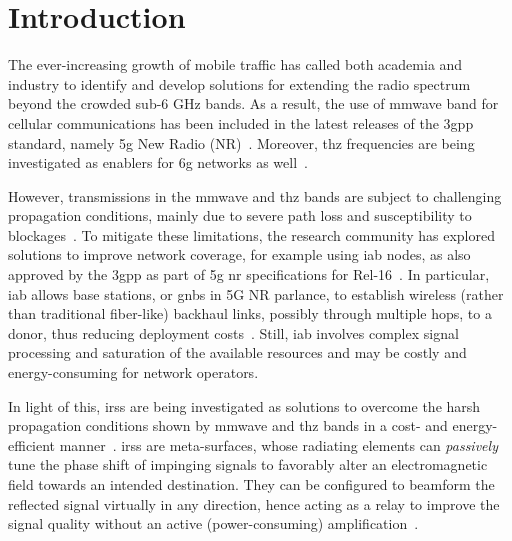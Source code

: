 \section{Introduction}
\label{sec:introduction}

The ever-increasing growth of mobile traffic has called both academia and industry to identify and develop solutions for extending the radio spectrum beyond the crowded sub-6 GHz bands. As a result, the use of \gls{mmwave} band for cellular communications has been included in the latest releases of the \gls{3gpp}  standard, namely \gls{5g} New Radio (NR)~\cite{3gpp.38.104}. Moreover, \gls{thz} frequencies are being investigated as enablers for \gls{6g} networks as well~\cite{tariq2020speculative}.

However, transmissions in the \gls{mmwave} and \gls{thz} bands are subject to challenging propagation conditions, mainly due to severe path loss and susceptibility to blockages~\cite{rangan2017potentials}.
To mitigate these limitations, the research community has explored solutions to improve network coverage, for example using \gls{iab} nodes, as also approved by the \gls{3gpp} as part of \gls{5g} \gls{nr} specifications for Rel-16~\cite{3gpp.38.174}.
In particular, \gls{iab} allows base stations, or \glspl{gnb} in 5G NR parlance, to establish wireless (rather than traditional fiber-like) backhaul links, possibly through multiple hops,  to a donor, thus reducing deployment costs~\cite{polese2020integrated}. Still, \gls{iab} involves complex signal processing and saturation of the available resources and may be costly and energy-consuming for network operators.

In light of this, \glspl{irs} are being investigated as solutions to overcome the harsh propagation conditions shown by \gls{mmwave} and \gls{thz} bands in a cost- and energy-efficient manner~\cite{flamini2022towards}. 
\glspl{irs} are meta-surfaces, whose radiating elements can \emph{passively} tune the phase shift of impinging signals to favorably alter an electromagnetic field towards an intended destination. They can be configured to beamform the reflected signal virtually in any direction, hence acting as a relay to improve the signal quality without an active (power-consuming) amplification~\cite{bjornson2019intelligent}. 

